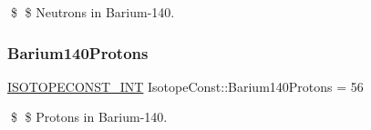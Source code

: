 \$ \$ Neutrons in Barium-\/140. \mbox{\label{group___isotope_const-_barium-_ba140_ga9577685f57cf574af2fbfea474131094}} 
\subsubsection{\texorpdfstring{Barium140\+Protons}{Barium140Protons}}
{\footnotesize\ttfamily \mbox{\hyperlink{group___isotope_const-_macros_ga5f18360b3e99483a35c32d789e62621c}{I\+S\+O\+T\+O\+P\+E\+C\+O\+N\+S\+T\+\_\+\+I\+NT}} Isotope\+Const\+::\+Barium140\+Protons = 56}

\$ \$ Protons in Barium-\/140. 